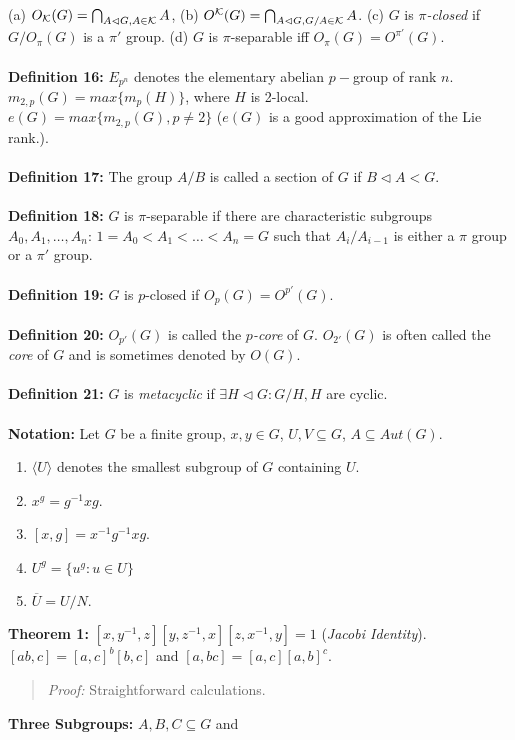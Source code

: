 (a) $O_{\cal K}(G) = \bigcap_{A \lhd G, A \in {\cal K}} A$,
(b) $O^{\cal K}(G)= \bigcap_{A \lhd G, G/A \in {\cal K}} A$.
(c) $G$ is $\pi$\emph{-closed} if $G/O_{\pi}(G)$ is a $\pi'$ group.
(d) $G$ is $\pi$-separable iff $O_{\pi}(G) = O^{\pi'}(G)$.
\\
\\
{\bf Definition 16:}
$E_{p^n}$ denotes the elementary abelian $p-$group of rank $n$.
$m_{2,p}(G) = max \{ m_p (H) \}$, where $H$ is 2-local.
$e(G) = max \{ m_{2,p} (G), p \ne 2 \}$ ($e(G)$ is a good approximation of
the Lie rank.).
\\
\\
{\bf Definition 17:} The group $A/B$ is called a section of $G$ if $B \lhd A <G$.
\\
\\
{\bf Definition 18:} $G$ is $\pi$-separable if there are characteristic subgroups
$A_0, A_1, \ldots , A_n$: $1=A_0<A_1<\ldots<A_n=G$ such that $A_i/A_{i-1}$ is
either a $\pi$ group or a $\pi'$ group.
\\
\\
{\bf Definition 19:} $G$ is $p$-closed if $O_p(G)= O^{p'}(G)$.
\\
\\
{\bf Definition 20:}
$O_{p'}(G)$ is called the $p$\emph{-core} of $G$. $O_{2'}(G)$ is often called the
\emph{core} of $G$ and is sometimes denoted by $O(G)$.
\\
\\
{\bf Definition 21:}
$G$ is
\emph{metacyclic} if $\exists H \lhd G: G/H ,H$ are cyclic.
\\
\\
{\bf Notation:}  Let $G$ be a finite group, $x, y \in G$, $U, V \subseteq G$,
$A \subseteq Aut(G)$.
\begin{enumerate}
\item $ \langle U \rangle $ denotes the smallest subgroup of $G$ containing $U$.
\item $x^g= g^{-1}xg$.
\item $[x,g]= x^{-1} g^{-1} x g$.
\item $U^g= \{ u^g: u \in U \}$
\item ${\overline U} = U/N$.
\end{enumerate}
{\bf Theorem 1:}
$ [x, y^{-1}, z] [y, z^{-1}, x] [z, x^{-1}, y]=1$
(\emph{Jacobi Identity}).
$[ab,c]= [a,c]^b [b,c]$ and $[a,bc]=[a,c] [a,b]^c$.
\begin{quote}
\emph{Proof:} Straightforward calculations.
\end{quote}
{\bf Three Subgroups:} $A, B, C \subseteq G$ and
